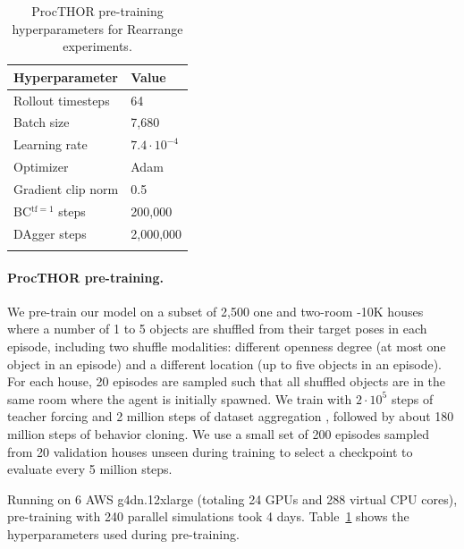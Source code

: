 
\begin{table}[htbp]
    \centering
    \begin{tabular}{ l l }
        \toprule
        \textbf{Hyperparameter}\qquad\qquad\qquad & \textbf{Value}\\
        \midrule
        Rollout timesteps & 64\\
        Batch size & 7,680 \\
        Learning rate & $7.4\cdot10^{-4}$\\
        Optimizer & Adam \cite{kingma2014adam} \\
        Gradient clip norm & 0.5 \\
        BC$^{\text{tf}=1}$ steps & 200,000 \\
        DAgger steps & 2,000,000 \\
        \toprule\\[-0.05in]
    \end{tabular}
    \caption{ProcTHOR pre-training hyperparameters for Rearrange experiments.}
    \label{tab:rearHp}
\end{table}

\paragraph{ProcTHOR pre-training.} We pre-train our model on a subset of 2,500 one and two-room \env{}-10K houses where a number of 1 to 5 objects are shuffled from their target poses in each episode, including two shuffle modalities: different openness degree (at most one object in an episode) and a different location (up to five objects in an episode). For each house, 20 episodes are sampled such that all shuffled objects are in the same room where the agent is initially spawned. We train with $2\cdot10^{5}$ steps of teacher forcing and 2 million steps of dataset aggregation \cite{Ross2011ARO}, followed by about 180 million steps of behavior cloning. We use a small set of 200 episodes sampled from 20 validation houses unseen during training to select a checkpoint to evaluate every 5 million steps.

Running on 6 AWS g4dn.12xlarge (totaling 24 GPUs and 288 virtual CPU cores), pre-training with 240 parallel simulations took 4 days. Table~\ref{tab:rearHp} shows the hyperparameters used during pre-training.

